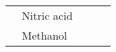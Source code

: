 {\begin{tabular}{@{}lp{5cm}p{2cm}p{2cm}p{12cm}@{}}
                                                      & Nitric acid                                            &                                                                                        &                                                   &                                                                                                                                                                                                                                                                                                                                                                                                                                                                                                                                                                                                                                                                                                                                                                                                                                                                                                                    \\ \cmidrule(l){2-2}
                                                      & Methanol                                               &                                                                                        &                                                   &                                                                                                                                                                                                                                                                                                                                                                                                                                                                                                                                                                                                                                                                                                                                                                                                                                                                                                                    \\ \cmidrule(l){2-5}

\end{tabular}}
